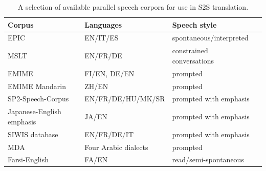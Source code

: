 \begin{table}[ht]
\begin{center}
\begin{tabular}{|l||l|l|l|}
\hline \bf Corpus & \bf Languages & \bf Speech style \\ \hline
EPIC                                            & EN/IT/ES              & spontaneous/interpreted   \\
MSLT                                            & EN/FR/DE              & constrained conversations \\
EMIME                                           & FI/EN, DE/EN          & prompted                  \\
EMIME Mandarin                                  & ZH/EN                 & prompted                  \\
SP2-Speech-Corpus                               & EN/FR/DE/HU/MK/SR     & prompted with emphasis    \\
Japanese-English emphasis                       & JA/EN                 & prompted with emphasis    \\
SIWIS database                                  & EN/FR/DE/IT           & prompted with emphasis    \\
MDA~\citep{almeman2013multi}                    & Four Arabic dialects  & prompted                  \\
Farsi-English~\citep{Melvin2004CreationOA}      & FA/EN                 & read/semi-spontaneous     \\
\hline
\end{tabular}
\end{center}
\caption{\label{sota:corpora} A selection of available parallel speech corpora for use in S2S translation. }
\end{table}

